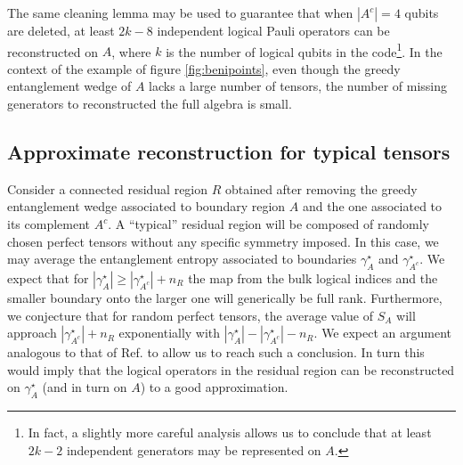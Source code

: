 \documentclass[12pt]{article}
\theoremstyle{plain}
\theoremstyle{plain}
\theoremstyle{plain}
\theoremstyle{plain}
\theoremstyle{result}
\theoremstyle{remark}
\theoremstyle{conjecture}
\theoremstyle{observation}
\theoremstyle{definition}
\theoremstyle{corollary}
\theoremstyle{definition}
\theoremstyle{definition}
\theoremstyle{assumption}
\theoremstyle{definition}
\theoremstyle{problem}
\theoremstyle{fact}
\begin{document}
The same cleaning lemma may be used to guarantee that when $|A^c|=4$ qubits are deleted, at least $2k-8$ independent logical Pauli operators can be reconstructed on $A$, where $k$ is the number of logical qubits in the code\footnote{In fact, a slightly more careful analysis allows us to conclude that at least $2k-2$ independent generators may be represented on $A$.}.
In the context of the example of figure \ref{fig:benipoints}, even though the greedy entanglement wedge of $A$ lacks a large number of tensors, the number of missing generators  to reconstructed the full algebra is small.

\subsection{Approximate reconstruction for typical tensors}

Consider a connected residual region $R$ obtained after removing the greedy entanglement wedge associated to boundary region $A$ and the one associated to its complement $A^c$.
A ``typical'' residual region will be composed of randomly chosen perfect tensors without any specific symmetry imposed.
In this case, we may average the entanglement entropy associated to boundaries $\gamma^\star_A$ and $\gamma^\star_{A^c}$.
We expect that for $|\gamma^\star_A| \geq | \gamma^\star_{A^c} | + n_R$ the map from the bulk logical indices and the smaller boundary onto the larger one will generically be full rank.
Furthermore, we conjecture that for random perfect tensors, the average value of $S_{A}$ will approach $ | \gamma^\star_{A^c} | + n_R$ exponentially with $|\gamma^\star_A| - | \gamma^\star_{A^c} | - n_R$.
We expect an argument analogous to that of Ref. \cite{Hayden07} to allow us to reach such a conclusion.
In turn this would imply that the logical operators in the residual region can   be reconstructed on $\gamma^\star_A$ (and in turn on $A$) to a good approximation.

%
%
\end{document}
